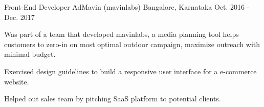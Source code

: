 \begin{cventries}
  \cventry
  {Front-End Developer} %
  {AdMavin (mavinlabs)} %
  {Bangalore, Karnataka} %
  {Oct. 2016 - Dec. 2017} %
  {
    \begin{cvitems} %
      \item {Was part of a team that developed mavinlabs, a media planning tool helps customers to zero-in on most optimal outdoor campaign, maximize outreach with minimal budget.}
      \item {Exercised design guidelines to build a responsive user interface for a e-commerce website.}
      \item {Helped out sales team by pitching SaaS platform to potential clients.}
    \end{cvitems}
  }

\end{cventries}
